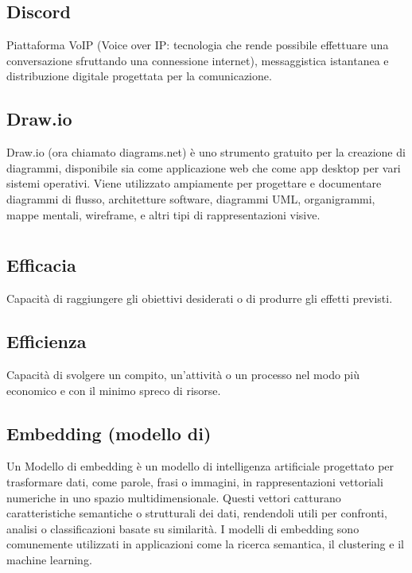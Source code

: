 \subsection*{Discord}
Piattaforma VoIP (Voice over IP: tecnologia che rende possibile effettuare una conversazione sfruttando una connessione internet), messaggistica istantanea 
e distribuzione digitale progettata per la comunicazione.

\subsection*{Draw.io}
Draw.io (ora chiamato diagrams.net) è uno strumento gratuito per la creazione di diagrammi, disponibile sia come applicazione web che come app desktop per 
vari sistemi operativi. Viene utilizzato ampiamente per progettare e documentare diagrammi di flusso, architetture software, diagrammi UML, organigrammi, 
mappe mentali, wireframe, e altri tipi di rappresentazioni visive.

\newpage



\section{}

\hypertarget{sec:efficacia}{}
\subsection*{Efficacia}
Capacità di raggiungere gli obiettivi desiderati o di produrre gli effetti previsti.

\hypertarget{sec:efficienza}{}
\subsection*{Efficienza}
Capacità di svolgere un compito, un'attività o un processo nel modo più economico e con il minimo spreco di risorse.

\hypertarget{sec:embedding}{}
\subsection*{Embedding (modello di)}
Un Modello di embedding è un modello di intelligenza artificiale progettato per trasformare dati, come parole, frasi o immagini, in rappresentazioni 
vettoriali numeriche in uno spazio multidimensionale. Questi vettori catturano caratteristiche semantiche o strutturali dei dati, rendendoli utili per 
confronti, analisi o classificazioni basate su similarità. I modelli di embedding sono comunemente utilizzati in applicazioni come la ricerca semantica, 
il clustering e il machine learning.

